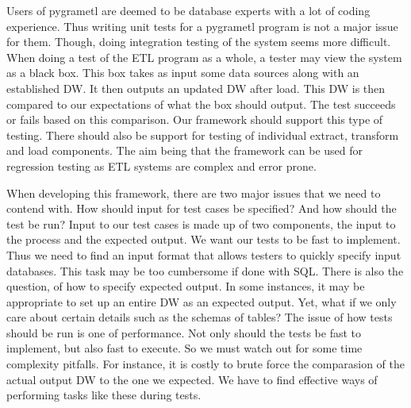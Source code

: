 Users of pygrametl are deemed to be database experts with a lot of coding experience. Thus writing unit tests for a pygrametl program is not a major issue for them. Though, doing integration testing of the system seems more difficult. When doing a test of the  ETL program as a whole, a tester may view the system as a black box. This box takes as input some data sources along with an established DW. It then outputs an updated DW after load. This DW is then compared to our expectations of what the box should output. The test succeeds or fails based on this comparison. Our framework should support this type of testing. There should also be support for testing of  individual extract, transform and load components. The aim being that the framework can be used for regression testing as ETL systems are complex and error prone. 

When developing this framework, there are two major issues that we need to contend with. How should input for test cases be specified? And how should the test be run?  Input to our test cases is made up of two components, the input to the process and the expected output. We want our tests to be fast to implement. Thus we need to find an input format that allows testers to quickly specify input databases. This task may be too cumbersome if done with SQL. There is also the question, of how to specify expected output. In some instances, it may be appropriate to set up an entire DW as an expected output. Yet, what if we only care about certain details such as the schemas of tables? The issue of how tests should be run is one of performance. Not only should the tests be fast to implement, but also fast to execute. So we must watch out for some time complexity pitfalls. For instance, it is costly to brute force the comparasion of the actual output DW to the one we expected. We have to find effective ways of performing tasks like these during tests. 


